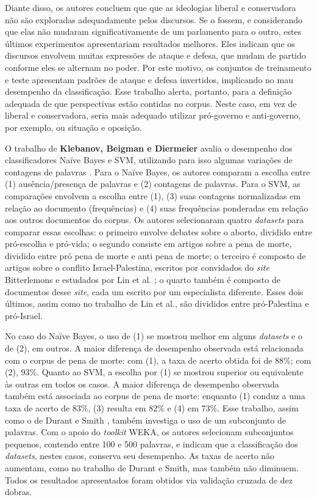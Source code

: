 Diante disso, os autores concluem que que as ideologias liberal e conservadora não são exploradas adequadamente pelos discursos. Se o fossem, e considerando que elas não mudaram significativamente de um parlamento para o outro, estes últimos experimentos apresentariam resultados melhores. Eles indicam que os discursos envolvem muitas expressões de ataque e defesa, que mudam de partido conforme eles se alternam no poder. Por este motivo, os conjuntos de treinamento e teste apresentam padrões de ataque e defesa invertidos, implicando no mau desempenho da classificação. Esse trabalho alerta, portanto, para a definição adequada de que perspectivas estão contidas no corpus. Neste caso, em vez de liberal e conservadora, seria mais adequado utilizar pró-governo e anti-governo, por exemplo, ou situação e oposição. %

O trabalho de \textbf{Klebanov, Beigman e Diermeier} avalia o desempenho dos classificadores Naïve Bayes e SVM, utilizando para isso algumas variações de contagens de palavras \cite{klebanov}. Para o Naïve Bayes, os autores comparam a escolha entre (1) ausência/presença de palavras e (2) contagens de palavras. Para o SVM, as comparações envolvem a escolha entre (1), (3) suas contagens normalizadas em relação ao documento (frequências) e (4) suas frequências ponderadas em relação aos outros documentos do corpus. Os autores selecionaram quatro \emph{datasets} para comparar essas escolhas: o primeiro envolve debates sobre o aborto, dividido entre pró-escolha e pró-vida; o segundo consiste em artigos sobre a pena de morte, dividido entre pró pena de morte e anti pena de morte; o terceiro é composto de artigos sobre o conflito Israel-Palestina, escritos por convidados do \emph{site} Bitterlemons e estudados por Lin et al. \cite{lin-et-al2006}; o quarto também é composto de documentos desse \emph{site}, cada um escrito por um especialista diferente. Esses dois últimos, assim como no trabalho de Lin et al., são divididos entre pró-Palestina e pró-Israel. 

No caso do Naïve Bayes, o uso de (1) se mostrou melhor em alguns \emph{datasets} e o de (2), em outros. A maior diferença de desempenho observada está relacionada com o corpus de pena de morte: com (1), a taxa de acerto obtida foi de 88\%; com (2), 93\%. Quanto ao SVM, a escolha por (1) se mostrou superior ou equivalente às outras em todos os casos.  A maior diferença de desempenho observada também está associada ao corpus de pena de morte: enquanto (1) conduz a uma taxa de acerto de 83\%, (3) resulta em 82\% e (4) em 73\%. Esse trabalho, assim como o de Durant e Smith \cite{durant-smith}, também investiga o uso de um subconjunto de palavras. Com o apoio do \emph{toolkit} WEKA, os autores selecionam subconjuntos pequenos, contendo entre 100 e 500 palavras, e indicam que a classificação dos \emph{datasets}, nestes casos, conserva seu desempenho. As taxas de acerto não aumentam, como no trabalho de Durant e Smith, mas também não diminuem. Todos os resultados apresentados foram obtidos via validação cruzada de dez dobras.

